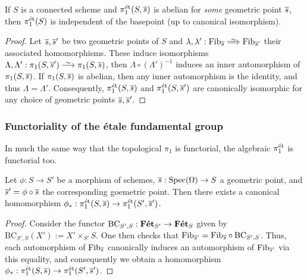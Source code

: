 \begin{cor}
	\label{cor:abelian_variety_canonical_efg}
	If $S$ is a connected scheme and $\pi_1^{\mathrm{\acute{e}t}}(S, \overline{s})$ is abelian for \emph{some} geometric point $\overline{s}$, then $\pi_1^{\mathrm{\acute{e}t}}(S)$ is independent of the basepoint (up to canonical isomorphism).
\end{cor}
\begin{proof}
	Let $\overline{s}, \overline{s}'$ be two geometric points of $S$ and $\lambda, \lambda' : \Fib_{\ol{s}} \ISO \Fib_{\ol{s}'}$ their associated homomorphisms. These induce isomorphisms $\Lambda, \Lambda' : \pi_1(S, \ol{s}') \iso \pi_1(S, \ol{s})$, then $\Lambda \circ (\Lambda')^{-1}$ induces an inner automorphism of $\pi_1(S, \overline{s})$. If $\pi_1(S, \overline{s})$ is abelian, then any inner automorphism is the identity, and thus $\Lambda = \Lambda'$. Consequently, $\pi_1^{\mathrm{\acute{e}t}}(S, \overline{s})$ and $\pi_1^{\mathrm{\acute{e}t}}(S, \overline{s}')$ are canonically isomorphic for any choice of geometric points $\overline{s}, \overline{s}'$.
\end{proof}

\subsubsection{Functoriality of the \'etale fundamental group}
\label{subsubsec:4_2_1_functoriality}
In much the same way that the topological $\pi_1$ is functorial, the algebraic $\pi_1^{\mathrm{\acute{e}t}}$ is functorial too.
\begin{prop}
	\label{prop:functoriality_of_pi1et}
	Let $\phi : S \to S'$ be a morphism of schemes, $\overline{s} : \mathrm{Spec}(\Omega) \to S$ a geometric point, and $\overline{s}' = \phi \circ \overline{s}$ the corresponding goemetric point. Then there exists a canonical homomorphism $\phi_* : \pi_1^{\mathrm{\acute{e}t}}(S, \overline{s}) \to \pi_1^{\mathrm{\acute{e}t}}(S', \overline{s}')$.
\end{prop}
\begin{proof}
	Consider the functor $\text{BC}_{S', S} : \mathbf{F\acute{e}t}_{S'} \to \mathbf{F\acute{e}t}_{S}$ given by $\text{BC}_{S', S}(X') := X' \times_{S'} S$. One then checks that $\mathrm{Fib}_{\overline{s}'} = \mathrm{Fib}_{\overline{s}} \circ \text{BC}_{S', S}$. Thus, each automorphism of $\mathrm{Fib}_{\overline{s}}$ canonically induces an automorphism of $\mathrm{Fib}_{\overline{s}'}$ via this equality, and consequently we obtain a homomorphism $\phi_* : \pi_1^{\mathrm{\acute{e}t}}(S, \overline{s}) \to \pi_1^{\mathrm{\acute{e}t}}(S', \overline{s}')$.
\end{proof}